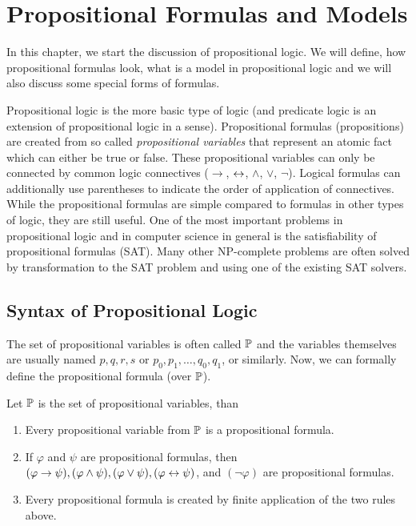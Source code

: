 
\chapter{Propositional Formulas and Models}

In this chapter, we start the discussion of propositional logic. We will define, how propositional formulas look, what is a model in propositional logic and we will also discuss some special forms of formulas.

Propositional logic is the more basic type of logic (and predicate logic is an extension of propositional logic in a sense).  Propositional formulas (propositions) are created from so called \emph{propositional variables} that represent an atomic fact which can either be true or false. These propositional variables can only be connected by common logic connectives ($\to$, $\leftrightarrow$, $\land$, $\lor$, $\neg$). Logical formulas can additionally use parentheses to indicate the order of application of connectives. While the propositional formulas are simple compared to formulas in other types of logic, they are still useful. One of the most important problems in propositional logic and in computer science in general is the satisfiability of propositional formulas (SAT). Many other NP-complete problems are often solved by transformation to the SAT problem and using one of the existing SAT solvers.

\section{Syntax of Propositional Logic}

The set of propositional variables is often called $\mathbb{P}$ and the variables themselves are usually named $p, q, r, s$ or $p_0, p_1, \dots, q_0, q_1$, or similarly. Now, we can formally define the propositional formula (over $\mathbb{P}$).

\begin{definition}
Let $\mathbb{P}$ is the set of propositional variables, than
\begin{enumerate}
  \item Every propositional variable from $\mathbb{P}$ is a propositional formula.
  \item If $\varphi$ and $\psi$ are propositional formulas, then $(\varphi \to \psi), (\varphi \land \psi), (\varphi \lor \psi), (\varphi \leftrightarrow \psi)$, and $(\neg \varphi)$ are propositional formulas.
  \item Every propositional formula is created by finite application of the two rules above.
\end{enumerate}
\end{definition}


